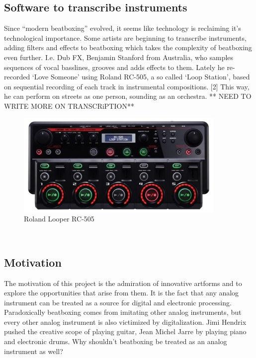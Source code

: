 \subsection{ Software to transcribe instruments }
Since “modern beatboxing” evolved, it seems like technology is reclaiming it’s technological importance. Some artists are beginning to transcribe instruments, adding filters and effects to beatboxing which takes the complexity of beatboxing even further. I.e. Dub FX, Benjamin Stanford from Australia, who samples sequences of vocal basslines, grooves and adds effects to them. Lately he re-recorded ‘Love Someone’ using Roland RC-505, a so called ‘Loop Station’, based on sequential recording of each track in instrumental compositions. [2] This way, he can perform on streets as one person, sounding as an orchestra. ** NEED TO WRITE MORE ON TRANSCRiPTION**
\\
\begin{figure}[h]
	\begin{center}
		\includegraphics[height=5cm]{fig/Roland-RC-505.JPG}
		\caption{Roland Looper RC-505}
		\label{Looper}
	\end{center}
\end{figure}
\\
\subsection{ Motivation }
The motivation of this project is the admiration of innovative artforms and to explore the opportunities that arise from them. It is the fact that any analog instrument can be treated as a source for digital and electronic processing. Paradoxically beatboxing comes from imitating other analog instruments, but every other analog instrument is also victimized by digitalization. Jimi Hendrix pushed the creative scope of playing guitar, Jean Michel Jarre by playing piano and electronic drums. Why shouldn’t beatboxing be treated as an analog instrument as well? 
